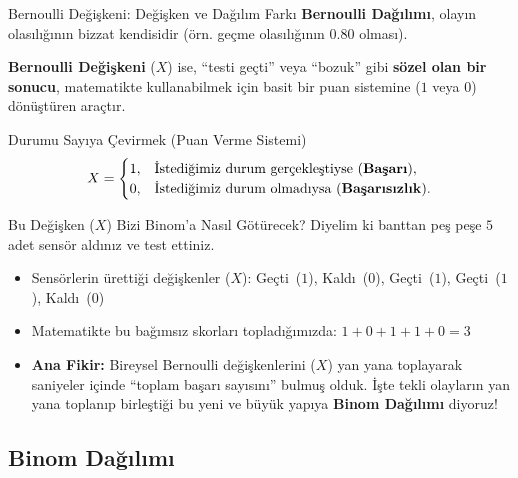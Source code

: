 \documentclass[light]{lutbeamer}
\begin{document}
\begin{frame}{Bernoulli Değişkeni: Değişken ve Dağılım Farkı}
    \small
    \textbf{Bernoulli Dağılımı}, olayın olasılığının bizzat kendisidir (örn. geçme olasılığının \(0.80\) olması). 
    
    \textbf{Bernoulli Değişkeni} (\(X\)) ise, ``testi geçti'' veya ``bozuk'' gibi \textbf{sözel olan bir sonucu}, matematikte kullanabilmek için basit bir puan sistemine (\(1\) veya \(0\)) dönüştüren araçtır.

    \begin{block}{Durumu Sayıya Çevirmek (Puan Verme Sistemi)}
        \[
        X=
        \begin{cases}
        1, & \text{İstediğimiz durum gerçekleştiyse (\textbf{Başarı})},\\
        0, & \text{İstediğimiz durum olmadıysa (\textbf{Başarısızlık})}.
        \end{cases}
        \]
    \end{block}

    \begin{exampleblock}{Bu Değişken (\(X\)) Bizi Binom'a Nasıl Götürecek?}
        Diyelim ki banttan peş peşe \(5\) adet sensör aldınız ve test ettiniz.
        \begin{itemize}
            \item Sensörlerin ürettiği değişkenler (\(X\)): Geçti~(\(1\)), Kaldı~(\(0\)), Geçti~(\(1\)), Geçti~(\(1\)), Kaldı~(\(0\))
            \item Matematikte bu bağımsız skorları topladığımızda: \(1+0+1+1+0 = 3\)
            \item \textbf{Ana Fikir:} Bireysel Bernoulli değişkenlerini (\(X\)) yan yana toplayarak saniyeler içinde ``toplam başarı sayısını'' bulmuş olduk. İşte tekli olayların yan yana toplanıp birleştiği bu yeni ve büyük yapıya \textbf{Binom Dağılımı} diyoruz!
        \end{itemize}
    \end{exampleblock}
\end{frame}

\subsection{Binom Dağılımı}
\end{document}
